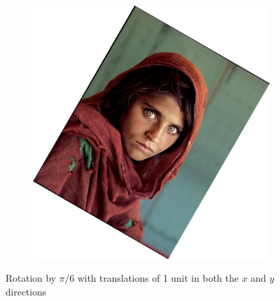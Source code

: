 \documentclass{article}
\begin{document}
\begin{figure}[H]
\begin{subfigure}{.3\textwidth}
    \end{subfigure}
    \begin{subfigure}{.3\textwidth}
        \centering
        \includegraphics[scale=0.04]{q1/output/similar_d:_6_s:_2.jpg}
    \end{subfigure}
    \caption{Rotation by \(\pi/6\) with translations of 1 unit in both the \(x\) and \(y\) directions}
\end{figure}
\end{document}
